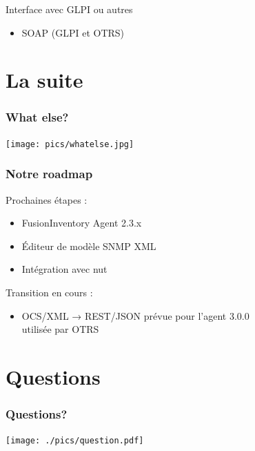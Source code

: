 \documentclass{beamer}
\begin{document}
\begin{frame}

    \begin{block}{Interface avec GLPI ou autres}
        \begin{itemize}
            \item SOAP (GLPI et OTRS)
        \end{itemize}
    \end{block}

\end{frame}

\section{La suite}

\begin{frame}
    \frametitle{What else?}

    \begin{center}
    \texttt{[image: pics/whatelse.jpg]}
    \end{center}

\end{frame}

\begin{frame}
    \frametitle{Notre roadmap}

    Prochaines étapes :
    \begin{itemize}
        \item FusionInventory Agent 2.3.x
        \item \'{E}diteur de modèle SNMP XML
        \item Intégration avec nut 
    \end{itemize}

    Transition en cours :
    \begin{itemize}
        \item OCS/XML → REST/JSON
        \small{prévue pour l'agent 3.0.0\\utilisée par OTRS}
    \end{itemize}

\end{frame}


\section{Questions}

\begin{frame}
    \frametitle{Questions?}

    \begin{center}

    \texttt{[image: ./pics/question.pdf]}

    \end{center}

\end{frame}
\end{document}
